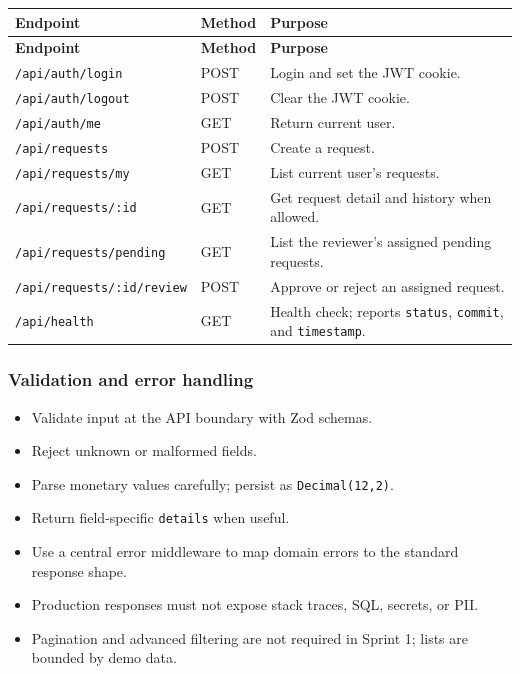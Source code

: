 \documentclass[11pt,a4paper]{article}
\begin{document}
\vspace{0.3em}
\begin{longtable}{|>{\RaggedRight}p{3.0cm}|>{\RaggedRight}p{6.8cm}|>{\RaggedRight}p{5.2cm}|}
\hline
\rowcolor{zenPale}\textbf{Endpoint} & \textbf{Method} & \textbf{Purpose} \\ \hline
\endfirsthead
\hline
\rowcolor{zenPale}\textbf{Endpoint} & \textbf{Method} & \textbf{Purpose} \\ \hline
\endhead
\hline
\endfoot
\texttt{/\allowbreak api/\allowbreak auth/\allowbreak login} & POST & Login and set the JWT cookie. \\ \hline
\texttt{/\allowbreak api/\allowbreak auth/\allowbreak logout} & POST & Clear the JWT cookie. \\ \hline
\texttt{/\allowbreak api/\allowbreak auth/\allowbreak me} & GET & Return current user. \\ \hline
\texttt{/\allowbreak api/\allowbreak requests} & POST & Create a request. \\ \hline
\texttt{/\allowbreak api/\allowbreak requests/\allowbreak my} & GET & List current user's requests. \\ \hline
\texttt{/\allowbreak api/\allowbreak requests/\allowbreak :\allowbreak id} & GET & Get request detail and history when allowed. \\ \hline
\texttt{/\allowbreak api/\allowbreak requests/\allowbreak pending} & GET & List the reviewer's assigned pending requests. \\ \hline
\texttt{/\allowbreak api/\allowbreak requests/\allowbreak :\allowbreak id/\allowbreak review} & POST & Approve or reject an assigned request. \\ \hline
\texttt{/\allowbreak api/\allowbreak health} & GET & Health check; reports \texttt{status}, \texttt{commit}, and \texttt{timestamp}. \\ \hline
\end{longtable}
\vspace{0.3em}

\subsubsection{Validation and error handling}

\begin{itemize}[leftmargin=*,itemsep=2pt,topsep=2pt]
  \item Validate input at the API boundary with Zod schemas.
  \item Reject unknown or malformed fields.
  \item Parse monetary values carefully; persist as \texttt{Decimal(12,2)}.
  \item Return field-specific \texttt{details} when useful.
  \item Use a central error middleware to map domain errors to the standard response shape.
  \item Production responses must not expose stack traces, SQL, secrets, or PII.
  \item Pagination and advanced filtering are not required in Sprint 1; lists are bounded by demo data.
\end{itemize}
\end{document}
